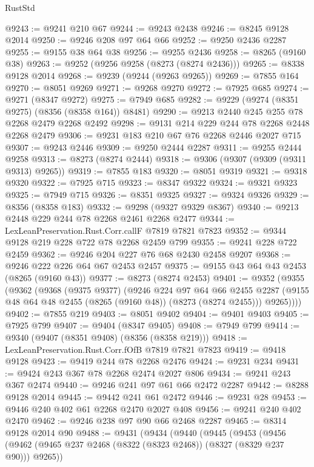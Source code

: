 \begin{lexlean}{RustStd}
\begin{coremodule}
{\begin{coremodule}
{{{{{{{{{{{{{{{{{{{{{{{{{{{{{{{{{{{{{{{{{{{{{{{{{{{{{{@9243 := @9241 @210 @67
@9244 := @9243 @2438
@9246 := @8245 @9128 @2014
@9250 := @9246 @208 @97 @64 @66
@9252 := @9250 @2436 @2287
@9255 := @9155 @38 @64 @38
@9256 := @9255 @2436
@9258 := @8265 (@9160 @38)
@9263 := @9252 (@9256 @9258 (@8273 (@8274 @2436)))
@9265 := @8338 @9128 @2014
@9268 := @9239 (@9244 (@9263 @9265))
@9269 := @7855 @164
@9270 := @8051 @9269
@9271 := @9268 @9270
@9272 := @7925 @685
@9274 := @9271 (@8347 @9272)
@9275 := @7949 @685
@9282 := @9229 (@9274 (@8351 @9275) (@8356 (@8358 @164)) @8481)
@9290 := @9213 @2440 @245 @255 @78 @2268 @2479 @2268 @2492
@9298 := @9131 @214 @229 @244 @78 @2268 @2448 @2268 @2479
@9306 := @9231 @183 @210 @67 @76 @2268 @2446 @2027 @715
@9307 := @9243 @2446
@9309 := @9250 @2444 @2287
@9311 := @9255 @2444 @9258
@9313 := @8273 (@8274 @2444)
@9318 := @9306 (@9307 (@9309 (@9311 @9313) @9265))
@9319 := @7855 @183
@9320 := @8051 @9319
@9321 := @9318 @9320
@9322 := @7925 @715
@9323 := @8347 @9322
@9324 := @9321 @9323
@9325 := @7949 @715
@9326 := @8351 @9325
@9327 := @9324 @9326
@9329 := @8356 (@8358 @183)
@9332 := @9298 (@9327 @9329 @8367)
@9340 := @9213 @2448 @229 @244 @78 @2268 @2461 @2268 @2477
@9344 := LexLeanPreservation.Rust.Corr.callF @7819 @7821 @7823
@9352 := @9344 @9128 @219 @228 @722 @78 @2268 @2459 @799
@9355 := @9241 @228 @722 @2459
@9362 := @9246 @204 @227 @76 @68 @2430 @2458 @9207
@9368 := @9246 @222 @226 @64 @67 @2453 @2457
@9375 := @9155 @43 @64 @43 @2453 (@8265 (@9160 @43))
@9377 := @8273 (@8274 @2453)
@9401 := @9352
    (@9355
      (@9362
        (@9368
          (@9375 @9377)
          (@9246
            @224
            @97
            @64
            @66
            @2455
            @2287
            (@9155 @48 @64 @48 @2455 (@8265 (@9160 @48)) (@8273 (@8274 @2455)))
            @9265))))
@9402 := @7855 @219
@9403 := @8051 @9402
@9404 := @9401 @9403
@9405 := @7925 @799
@9407 := @9404 (@8347 @9405)
@9408 := @7949 @799
@9414 := @9340 (@9407 (@8351 @9408) (@8356 (@8358 @219)))
@9418 := LexLeanPreservation.Rust.Corr.fOfB @7819 @7821 @7823
@9419 := @9418 @9128
@9423 := @9419 @244 @78 @2268 @2476
@9424 := @9231 @234
@9431 := @9424 @243 @367 @78 @2268 @2474 @2027 @806
@9434 := @9241 @243 @367 @2474
@9440 := @9246 @241 @97 @61 @66 @2472 @2287
@9442 := @8288 @9128 @2014
@9445 := @9442 @241 @61 @2472
@9446 := @9231 @28
@9453 := @9446 @240 @402 @61 @2268 @2470 @2027 @408
@9456 := @9241 @240 @402 @2470
@9462 := @9246 @238 @97 @90 @66 @2468 @2287
@9465 := @8314 @9128 @2014 @90
@9488 := @9431
    (@9434
      (@9440
        (@9445
          (@9453
            (@9456 (@9462 (@9465 @237 @2468 (@8322 (@8323 @2468)) (@8327 (@8329 @237 @90))) @9265))
}}}}}}}}}}}}}}}}}}}}}}}}}}}}}}}}}}}}}}}}}}}}}}}}}}}}}}
\end{coremodule}}
\end{coremodule}
\end{lexlean}
